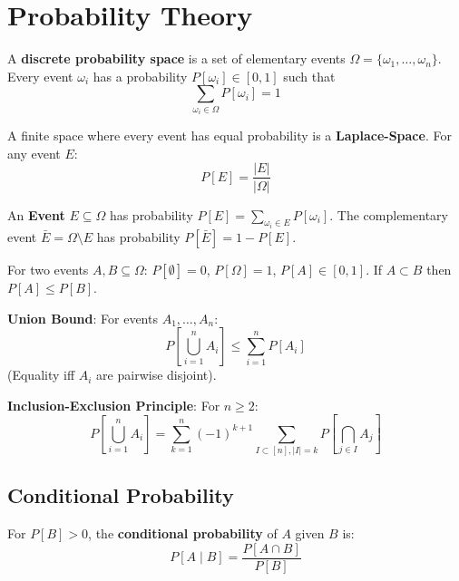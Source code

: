 \section{Probability Theory}

\begin{definition}
	A \textbf{discrete probability space} is a set of elementary events $\Omega = \{\omega_1, \dots, \omega_n \}$.
	Every event $\omega_i$ has a probability $P[\omega_i] \in [0,1]$ such that
	$$\sum_{\omega_i \in \Omega} P[\omega_i] = 1$$
\end{definition}

\begin{remark}
	A finite space where every event has equal probability is a \textbf{Laplace-Space}. For any event $E$:
	$$P[E] = \frac{\vert E \vert}{\vert \Omega \vert}$$
\end{remark}

\begin{definition}
	An \textbf{Event} $E \subseteq \Omega$ has probability $P[E] = \sum_{\omega_i \in E} P[\omega_i]$.
	The complementary event $\bar{E} = \Omega \setminus E$ has probability $P[\bar{E}] = 1 - P[E]$.
\end{definition}

\begin{theorem}
	For two events $A, B \subseteq \Omega$:
	$P[\emptyset] = 0$, $P[\Omega] = 1$, $P[A] \in [0,1]$.
	If $A \subset B$ then $P[A] \le P[B]$.
\end{theorem}

\begin{theorem}
	\textbf{Union Bound}: For events $A_1, \dots, A_n$:
	$$P[\bigcup_{i=1}^n A_i] \leq \sum_{i=1}^n P[A_i]$$
	(Equality iff $A_i$ are pairwise disjoint).
\end{theorem}

\begin{theorem}
	\textbf{Inclusion-Exclusion Principle}: For $n \geq 2$:
	$$P[\bigcup_{i=1}^n A_i] = \sum_{k=1}^n (-1)^{k+1} \sum_{I \subset [n], |I|=k} P[\bigcap_{j \in I} A_j]$$
\end{theorem}

\subsection{Conditional Probability}

\begin{definition}
	For $P[B] > 0$, the \textbf{conditional probability} of $A$ given $B$ is:
	$$P[A \mid B] = \frac{P[A \cap B]}{P[B]}$$
\end{definition}

